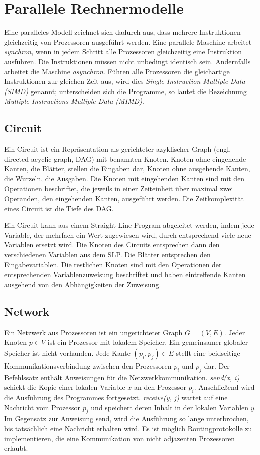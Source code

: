 \section{Parallele Rechnermodelle}
Eine paralleles Modell zeichnet sich dadurch aus, dass mehrere Instruktionen gleichzeitig von Prozessoren ausgeführt werden.
Eine parallele Maschine arbeitet \emph{synchron}, wenn in jedem Schritt alle Prozessoren gleichzeitig eine Instruktion ausführen.
Die Instruktionen müssen nicht unbedingt identisch sein.
Andernfalls arbeitet die Maschine \emph{asynchron}.
Führen alle Prozessoren die gleichartige Instruktionen zur gleichen Zeit aus, wird dies \emph{Single Instruction Multiple Data (SIMD)} genannt; unterscheiden sich die Programme, so lautet die Bezeichnung \emph{Multiple Instructions Multiple Data (MIMD)}.

\subsection{Circuit}
Ein Circuit ist ein Repräsentation als gerichteter azyklischer Graph (engl. directed acyclic graph, DAG) mit benannten Knoten.
Knoten ohne eingehende Kanten, die Blätter, stellen die Eingaben dar, Knoten ohne ausgehende Kanten, die Wurzeln, die Ausgaben.
Die Knoten mit eingehenden Kanten sind mit den Operationen beschriftet, die jeweils in einer Zeiteinheit über maximal zwei Operanden, den eingehenden Kanten, ausgeführt werden.
Die Zeitkomplexität eines Circuit ist die Tiefe des DAG.

Ein Circuit kann aus einem Straight Line Program abgeleitet werden, indem jede Variable, der mehrfach ein Wert zugewiesen wird, durch entsprechend viele neue Variablen ersetzt wird.
Die Knoten des Circuits entsprechen dann den verschiedenen Variablen aus dem SLP.
Die Blätter entsprechen den Eingabevariablen.
Die restlichen Knoten sind mit den Operationen der entsprechenden Variablenzuweisung beschriftet und haben eintreffende Kanten ausgehend von den Abhängigkeiten der Zuweisung.
\cite[S.7]{jaja}\cite[S.11f.]{reif}


\subsection{Network}
Ein Netzwerk aus Prozessoren ist ein ungerichteter Graph $G = (V,E)$.
Jeder Knoten $p \in V$ ist ein Prozessor mit lokalem Speicher. Ein gemeinsamer globaler Speicher ist nicht vorhanden.
Jede Kante $(p_i, p_j) \in E$ stellt eine beidseitige Kommunikationsverbindung zwischen den Prozessoren $p_i$ und $p_j$ dar.
Der Befehlssatz enthält Anweisungen für die Netzwerkkommunikation.
\emph{send(x, i)} schickt die Kopie einer lokalen Variable $x$ an den Prozessor $p_i$.
Anschließend wird die Ausführung des Programmes fortgesetzt.
\emph{receive(y, j)} wartet auf eine Nachricht vom Prozessor $p_j$ und speichert deren Inhalt in der lokalen Variablen $y$.
Im Gegensatz zur Anweisung send, wird die Ausführung so lange unterbrochen, bis tatsächlich eine Nachricht erhalten wird.
Es ist möglich Routingprotokolle zu implementieren, die eine Kommunikation von nicht adjazenten Prozessoren erlaubt.

